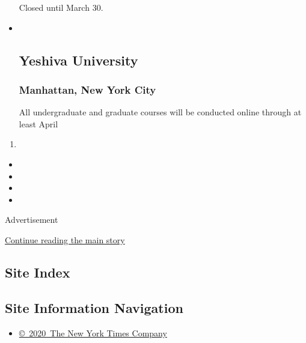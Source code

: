 \begin{itemize}
  Closed until March 30.
\item ~
  \hypertarget{yeshiva-university}{%
  \subsection{Yeshiva University}\label{yeshiva-university}}

  \hypertarget{manhattan-new-york-city-17}{%
  \subsubsection{Manhattan, New York
  City}\label{manhattan-new-york-city-17}}

  All undergraduate and graduate courses will be conducted online
  through at least April
\end{itemize}

\begin{enumerate}
\def\labelenumi{\arabic{enumi}.}
\setcounter{enumi}{2}
\item
\end{enumerate}

\begin{itemize}
\item
\item
\item
\item
\end{itemize}

Advertisement

\protect\hyperlink{after-bottom}{Continue reading the main story}

\hypertarget{site-index}{%
\subsection{Site Index}\label{site-index}}

\hypertarget{site-information-navigation}{%
\subsection{Site Information
Navigation}\label{site-information-navigation}}

\begin{itemize}
\tightlist
\item
  \href{https://help.nytimes3xbfgragh.onion/hc/en-us/articles/115014792127-Copyright-notice}{©~2020~The
  New York Times Company}
\end{itemize}

